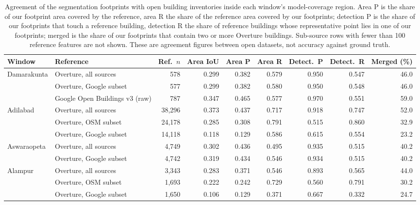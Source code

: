 \documentclass[preprint,12pt]{elsarticle}
\begin{document}
\begin{table}[htbp]
\caption{Agreement of the segmentation footprints with open building inventories inside each window's model-coverage region. Area P is the share of our footprint area covered by the reference, area R the share of the reference area covered by our footprints; detection P is the share of our footprints that touch a reference building, detection R the share of reference buildings whose representative point lies in one of our footprints; merged is the share of our footprints that contain two or more Overture buildings. Sub-source rows with fewer than 100 reference features are not shown. These are agreement figures between open datasets, not accuracy against ground truth.}
\label{tab:xval}
\centering
\footnotesize
\begin{adjustbox}{max width=\textwidth}
\begin{tabular}{@{}llrrrrrrr@{}}
\toprule
Window & Reference & Ref.\ $n$ & Area IoU & Area P & Area R & Detect.\ P & Detect.\ R & Merged (\%)\\
\midrule
Damarakunta & Overture, all sources & 578 & 0.299 & 0.382 & 0.579 & 0.950 & 0.547 & 46.0\\
 & Overture, Google subset & 577 & 0.299 & 0.382 & 0.580 & 0.950 & 0.548 & 46.0\\
 & Google Open Buildings v3 (raw) & 787 & 0.347 & 0.465 & 0.577 & 0.970 & 0.551 & 59.0\\
\addlinespace
Adilabad & Overture, all sources & 38{,}296 & 0.373 & 0.437 & 0.717 & 0.918 & 0.747 & 52.0\\
 & Overture, OSM subset & 24{,}178 & 0.285 & 0.308 & 0.791 & 0.515 & 0.860 & 32.9\\
 & Overture, Google subset & 14{,}118 & 0.118 & 0.129 & 0.586 & 0.615 & 0.554 & 23.2\\
\addlinespace
Aswaraopeta & Overture, all sources & 4{,}749 & 0.302 & 0.436 & 0.495 & 0.935 & 0.515 & 40.2\\
 & Overture, Google subset & 4{,}742 & 0.319 & 0.434 & 0.546 & 0.934 & 0.515 & 40.2\\
\addlinespace
Alampur & Overture, all sources & 3{,}343 & 0.283 & 0.371 & 0.546 & 0.893 & 0.565 & 44.0\\
 & Overture, OSM subset & 1{,}693 & 0.222 & 0.242 & 0.729 & 0.560 & 0.791 & 30.2\\
 & Overture, Google subset & 1{,}650 & 0.106 & 0.129 & 0.371 & 0.667 & 0.332 & 24.7\\
\bottomrule
\end{tabular}
\end{adjustbox}
\end{table}
\end{document}
